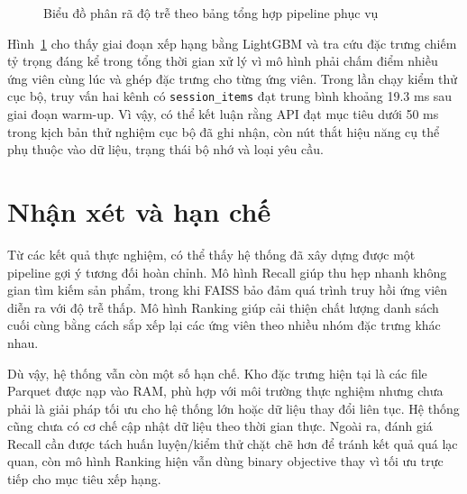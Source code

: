 \begin{figure}[H]
\centering
{}
\caption{Biểu đồ phân rã độ trễ theo bảng tổng hợp pipeline phục vụ}
\label{fig:serving_latency_breakdown}
\end{figure}

Hình~\ref{fig:serving_latency_breakdown} cho thấy giai đoạn xếp hạng bằng LightGBM và tra cứu đặc trưng chiếm tỷ trọng đáng kể trong tổng thời gian xử lý vì mô hình phải chấm điểm nhiều ứng viên cùng lúc và ghép đặc trưng cho từng ứng viên. Trong lần chạy kiểm thử cục bộ, truy vấn hai kênh có \texttt{session\_items} đạt trung bình khoảng 19.3 ms sau giai đoạn warm-up. Vì vậy, có thể kết luận rằng API đạt mục tiêu dưới 50 ms trong kịch bản thử nghiệm cục bộ đã ghi nhận, còn nút thắt hiệu năng cụ thể phụ thuộc vào dữ liệu, trạng thái bộ nhớ và loại yêu cầu.

\section{Nhận xét và hạn chế}
Từ các kết quả thực nghiệm, có thể thấy hệ thống đã xây dựng được một pipeline gợi ý tương đối hoàn chỉnh. Mô hình Recall giúp thu hẹp nhanh không gian tìm kiếm sản phẩm, trong khi FAISS bảo đảm quá trình truy hồi ứng viên diễn ra với độ trễ thấp. Mô hình Ranking giúp cải thiện chất lượng danh sách cuối cùng bằng cách sắp xếp lại các ứng viên theo nhiều nhóm đặc trưng khác nhau.
\medskip

Dù vậy, hệ thống vẫn còn một số hạn chế. Kho đặc trưng hiện tại là các file Parquet được nạp vào RAM, phù hợp với môi trường thực nghiệm nhưng chưa phải là giải pháp tối ưu cho hệ thống lớn hoặc dữ liệu thay đổi liên tục. Hệ thống cũng chưa có cơ chế cập nhật dữ liệu theo thời gian thực. Ngoài ra, đánh giá Recall cần được tách huấn luyện/kiểm thử chặt chẽ hơn để tránh kết quả quá lạc quan, còn mô hình Ranking hiện vẫn dùng binary objective thay vì tối ưu trực tiếp cho mục tiêu xếp hạng.
